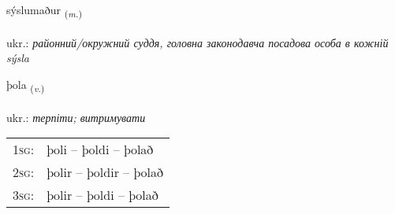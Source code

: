 \documentclass[frontgrid, backgrid]{flacards}\usepackage[]{graphicx}\usepackage[]{xcolor}
\begin{document}
\renewcommand{\flhead}{\vskip5pt \fboxsep=0pt {\small\bfseries\footnotesize Nafnorð | іменник}}
\renewcommand{\fcfoot}{\vskip5pt \fboxsep=0pt \hspace{2pt}{\small\bfseries\footnotesize 2K}}

\renewcommand{\blhead}{\vskip5pt {\small\bfseries\footnotesize Nafnorð | іменник }}
\renewcommand{\bcfoot}{\vskip5pt \hspace{2pt}{\small\bfseries\footnotesize 2K}}


{sýslumaður \small{\textsubscript{(\textit{m.})}} \\[1ex] %
\textphonetic{[sistlʏmaðʏr]} \\
ukr.: \emph{районний/окружний суддя, головна законодавча посадова особа в кожній sýsla} \\  [2ex]
\renewcommand*{\arraystretch}{0.8}
}

\renewcommand{\flhead}{\vskip5pt \fboxsep=0pt {\small\bfseries\footnotesize Sagnorð | дієслово}}
\renewcommand{\fcfoot}{\vskip5pt \fboxsep=0pt \hspace{2pt}{\small\bfseries\footnotesize 2K}}

\renewcommand{\blhead}{\vskip5pt {\small\bfseries\footnotesize Sagnorð | дієслово }}
\renewcommand{\bcfoot}{\vskip5pt \hspace{2pt}{\small\bfseries\footnotesize 2K}}


{þola \small{\textsubscript{(\textit{v.})}} \\[1ex] %
\textphonetic{[θɔːla]} \\
ukr.: \emph{терпіти; витримувати} \\  [2ex]
\renewcommand*{\arraystretch}{0.8}
\begin{tabular}{p{1cm}l}
\textsc{1sg}: & þoli -- þoldi -- þolað \\ 
\textsc{2sg}: & þolir -- þoldir -- þolað \\ 
\textsc{3sg}: & þolir -- þoldi -- þolað \\ 
\end{tabular}
}
\end{document}
